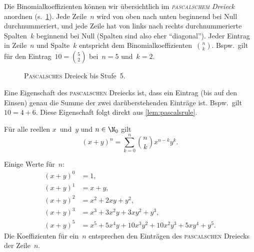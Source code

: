 \documentclass[a4paper]{article}
\begin{document}
Die Binomialkoeffizienten können wir übersichtlich im \emph{\textsc{pascalschem} Dreieck} anordnen (s.~\cref{fig:pascalstriangle}). Jede Zeile~$n$ wird von oben nach unten beginnend bei Null durchnummeriert, und jede Zeile hat von links nach rechts durchnummerierte Spalten~$k$ beginnend bei Null (Spalten sind also eher "`diagonal"'). Jeder Eintrag in Zeile~$n$ und Spalte~$k$ entspricht dem Binomialkoeffizienten~$\binom{n}{k}$. Bspw.\ gilt für den Eintrag~$10 = \binom{5}{2}$ bei~$n = 5$ und~$k = 2$.

\begin{figure}[htbp]
    \caption{\textsc{Pascalsches} Dreieck bis Stufe~5.}\label{fig:pascalstriangle}
\end{figure}

Eine Eigenschaft des \textsc{pascalschen} Dreiecks ist, dass ein Eintrag (bis auf den Einsen) genau die Summe der zwei darüberstehenden Einträge ist. Bspw.\ gilt~$10 = 4 + 6$. Diese Eigenschaft folgt direkt aus \cref{lem:pascalsrule}.

\begin{theorem}
    Für alle reellen $x$~und~$y$ und $n \in \N_0$ gilt
    \begin{equation*}
        (x + y)^n = \sum_{k = 0}^n \binom{n}{k} x^{n - k} y^k.
    \end{equation*}
\end{theorem}

Einige Werte für~$n$:
\begin{align*}
    (x+y)^0 & = 1,                         \\
    (x+y)^1 & = x+y,                       \\
    (x+y)^2 & = x^2 + 2xy + y^2,           \\
    (x+y)^3 & = x^3 + 3x^2y + 3xy^2 + y^3, \\
    (x+y)^5 &= x^5 + 5x^4y + 10x^3y^2 + 10x^2y^3 + 5xy^4 + y^5.
\end{align*}
Die Koeffizienten für ein~$n$ entsprechen den Einträgen des \textsc{pascalschen} Dreiecks der Zeile~$n$.
\end{document}
